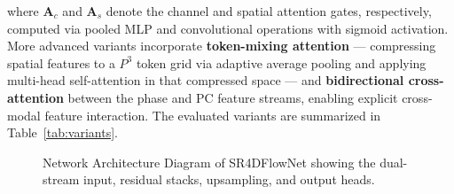 \documentclass[11pt]{article}
\begin{document}
where $\mathbf{A}_c$ and $\mathbf{A}_s$ denote the channel and spatial attention gates, respectively, computed via pooled MLP and convolutional operations with sigmoid activation. More advanced variants incorporate \textbf{token-mixing attention} \cite{vaswani2017attention} --- compressing spatial features to a $P^3$ token grid via adaptive average pooling and applying multi-head self-attention in that compressed space --- and \textbf{bidirectional cross-attention} between the phase and PC feature streams, enabling explicit cross-modal feature interaction. The evaluated variants are summarized in Table~\ref{tab:variants}.

\begin{figure}[!htbp]
    \centering
    \caption{Network Architecture Diagram of SR4DFlowNet showing the dual-stream input, residual stacks, upsampling, and output heads.}
    \label{fig:architecture}
\end{figure}

\end{document}
